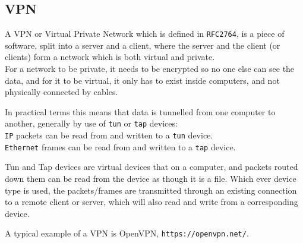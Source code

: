 \subsection{VPN}
A VPN or Virtual Private Network which is defined in \texttt{RFC2764}\cite{rfc2764}, is a piece of software, split into a server and a client, where the server and the client (or clients) form a network which is both virtual and private.\\
For a network to be private, it needs to be encrypted so no one else can see the data, and for it to be virtual, it only has to exist inside computers, and not physically connected by cables.\par In practical terms this means that data is tunnelled from one computer to another, generally by use of \texttt{tun} or \texttt{tap} devices:\\
\texttt{IP} packets can be read from and written to a \texttt{tun} device.\\
\texttt{Ethernet} frames can be read from and written to a \texttt{tap} device.\par
Tun and Tap devices are virtual devices that on a computer, and packets routed down them can be read from the device as though it is a file.
Which ever device type is used, the packets/frames are transmitted through an existing connection to a remote client or server, which will also read and write from a corresponding device.\par
A typical example of a VPN is OpenVPN, \texttt{https://openvpn.net/}.



